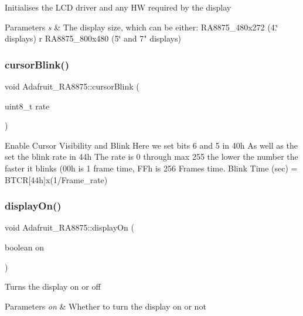 Initialises the L\+CD driver and any HW required by the display


\begin{DoxyParams}{Parameters}
{\em s} & The display size, which can be either\+: \textquotesingle{}R\+A8875\+\_\+480x272\textquotesingle{} (4.\char`\"{} displays) r
            \textquotesingle{}\+R\+A8875\+\_\+800x480\textquotesingle{} (5\char`\"{} and 7" displays) \\
\hline
\end{DoxyParams}
\mbox{\label{class_adafruit___r_a8875_a7dc51babe54f65192d1b38d30a8d1b74}} 
\subsubsection{\texorpdfstring{cursorBlink()}{cursorBlink()}}
{\footnotesize\ttfamily void Adafruit\+\_\+\+R\+A8875\+::cursor\+Blink (\begin{DoxyParamCaption}\item[{uint8\+\_\+t}]{rate }\end{DoxyParamCaption})}

Enable Cursor Visibility and Blink Here we set bits 6 and 5 in 40h As well as the set the blink rate in 44h The rate is 0 through max 255 the lower the number the faster it blinks (00h is 1 frame time, F\+Fh is 256 Frames time. Blink Time (sec) = B\+T\+CR\mbox{[}44h\mbox{]}x(1/\+Frame\+\_\+rate) \mbox{\label{class_adafruit___r_a8875_ac8b6193126c329a2e45e9f962dc4b30e}} 
\subsubsection{\texorpdfstring{displayOn()}{displayOn()}}
{\footnotesize\ttfamily void Adafruit\+\_\+\+R\+A8875\+::display\+On (\begin{DoxyParamCaption}\item[{boolean}]{on }\end{DoxyParamCaption})}

Turns the display on or off


\begin{DoxyParams}{Parameters}
{\em on} & Whether to turn the display on or not \\
\hline
\end{DoxyParams}
\mbox{\label{class_adafruit___r_a8875_a94d9aa8fb911d93213e575476a720bb0}} 
